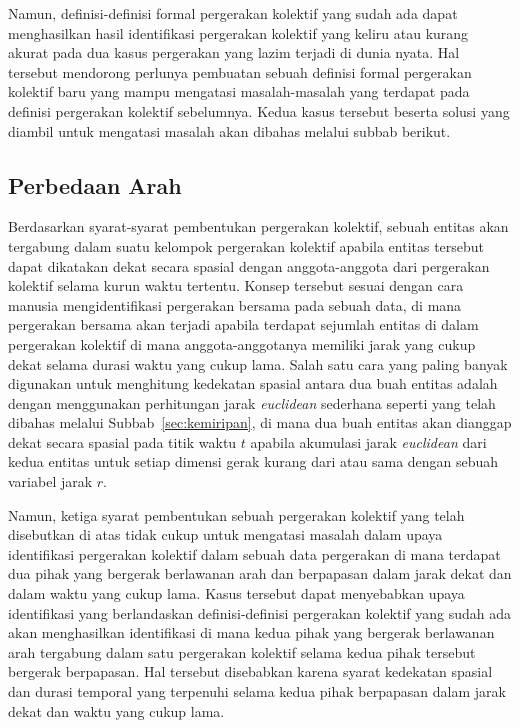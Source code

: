 Namun, definisi-definisi formal pergerakan kolektif yang sudah ada dapat menghasilkan hasil identifikasi pergerakan kolektif yang keliru atau kurang akurat pada dua kasus pergerakan yang lazim terjadi di dunia nyata. Hal tersebut mendorong perlunya pembuatan sebuah definisi formal pergerakan kolektif baru yang mampu mengatasi masalah-masalah yang terdapat pada definisi pergerakan kolektif sebelumnya. Kedua kasus tersebut beserta solusi yang diambil untuk mengatasi masalah akan dibahas melalui subbab berikut.

\subsection{Perbedaan Arah}
\label{subsec:beda-arah}
    
Berdasarkan syarat-syarat pembentukan pergerakan kolektif, sebuah entitas akan tergabung dalam suatu kelompok pergerakan kolektif apabila entitas tersebut dapat dikatakan dekat secara spasial dengan anggota-anggota dari pergerakan kolektif selama kurun waktu tertentu. Konsep tersebut sesuai dengan cara manusia mengidentifikasi pergerakan bersama pada sebuah data, di mana pergerakan bersama akan terjadi apabila terdapat sejumlah entitas di dalam pergerakan kolektif di mana anggota-anggotanya memiliki jarak yang cukup dekat selama durasi waktu yang cukup lama. Salah satu cara yang paling banyak digunakan untuk menghitung kedekatan spasial antara dua buah entitas adalah dengan menggunakan perhitungan jarak \textit{euclidean} sederhana seperti yang telah dibahas melalui Subbab~\ref{sec:kemiripan}, di mana dua buah entitas akan dianggap dekat secara spasial pada titik waktu $t$ apabila akumulasi jarak \textit{euclidean} dari kedua entitas untuk setiap dimensi gerak kurang dari atau sama dengan sebuah variabel jarak $r$.

Namun, ketiga syarat pembentukan sebuah pergerakan kolektif yang telah disebutkan di atas tidak cukup untuk mengatasi masalah dalam upaya identifikasi pergerakan kolektif dalam sebuah data pergerakan di mana terdapat dua pihak yang bergerak berlawanan arah dan berpapasan dalam jarak dekat dan dalam waktu yang cukup lama. Kasus tersebut dapat menyebabkan upaya identifikasi yang berlandaskan definisi-definisi pergerakan kolektif yang sudah ada akan menghasilkan identifikasi di mana kedua pihak yang bergerak berlawanan arah tergabung dalam satu pergerakan kolektif selama kedua pihak tersebut bergerak berpapasan. Hal tersebut disebabkan karena syarat kedekatan spasial dan durasi temporal yang terpenuhi selama kedua pihak berpapasan dalam jarak dekat dan waktu yang cukup lama.

